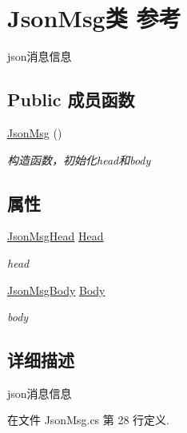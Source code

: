 \hypertarget{class_json_msg}{\section{Json\-Msg类 参考}
\label{class_json_msg}
}


json消息信息  


\subsection*{Public 成员函数}
\begin{DoxyCompactItemize}
\item 
\hyperlink{class_json_msg_a8e07cff4a7b96a2d1e454d409c84b63f}{Json\-Msg} ()
\begin{DoxyCompactList}\small\item\em 构造函数，初始化head和body \end{DoxyCompactList}\end{DoxyCompactItemize}
\subsection*{属性}
\begin{DoxyCompactItemize}
\item 
\hyperlink{class_json_msg_head}{Json\-Msg\-Head} \hyperlink{class_json_msg_a4c8f6abb4969fe20026f3ab370a80b4f}{Head}
\begin{DoxyCompactList}\small\item\em head \end{DoxyCompactList}\item 
\hyperlink{class_json_msg_body}{Json\-Msg\-Body} \hyperlink{class_json_msg_a0f4fea84118d6c732698e80709289cc6}{Body}
\begin{DoxyCompactList}\small\item\em body \end{DoxyCompactList}\end{DoxyCompactItemize}


\subsection{详细描述}
json消息信息 



在文件 Json\-Msg.\-cs 第 28 行定义.



